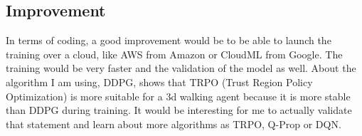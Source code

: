 \documentclass{article}
\begin{document}
\subsection{Improvement}

In terms of coding, a good improvement would be to be able to launch the training over a cloud,
like AWS from Amazon or CloudML from Google. The training would be very faster and the validation
of the model as well. About the algorithm I am using, DDPG, \citeauthor{GuLilGhaTurLev17} shows
that TRPO (Trust Region Policy Optimization) is more suitable for a 3d walking
agent because it is more stable than DDPG during training. It would be
interesting for me to actually validate that statement and learn about more
algorithms as TRPO, Q-Prop or DQN.



\end{document}
